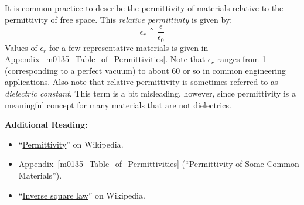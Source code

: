 It is common practice to describe the permittivity of materials relative to the permittivity of free space.
This \emph{relative permittivity} 
is given by:
%
\begin{equation}
\epsilon_r \triangleq \frac{\epsilon}{\epsilon_0}
\end{equation}
%  
Values of $\epsilon_r$ for a few representative materials is given in Appendix~\ref{m0135_Table_of_Permittivities}.  
Note that $\epsilon_r$ ranges from 1 (corresponding to a perfect vacuum) to about 60 or so in common engineering applications.  
Also note that relative permittivity is sometimes referred to as \emph{dielectric constant}. 
This term is a bit misleading, however, since permittivity is a meaningful concept for many materials that are not dielectrics.


{\bf Additional Reading:}
\begin{itemize}
\item ``\href{https://en.wikipedia.org/wiki/Permittivity}{Permittivity}'' on Wikipedia.
\item Appendix~\ref{m0135_Table_of_Permittivities} (``Permittivity of Some Common Materials'').
\item ``\href{https://en.wikipedia.org/wiki/Inverse-square_law}{Inverse square law}'' on Wikipedia.
\end{itemize}



